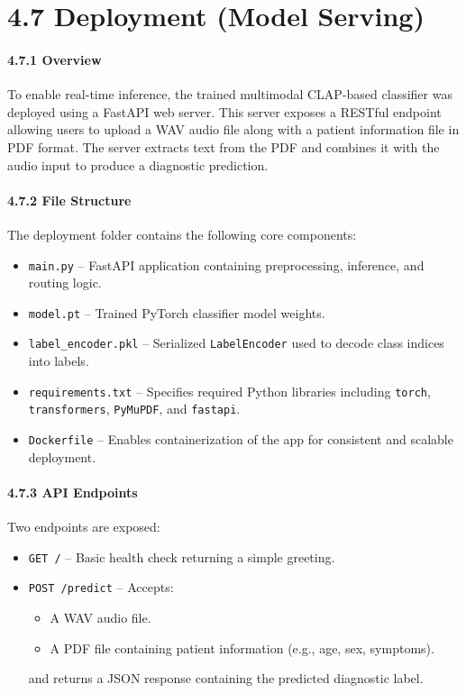 \section*{4.7 Deployment (Model Serving)}

\paragraph{4.7.1 Overview\\}
To enable real-time inference, the trained multimodal CLAP-based classifier was deployed using a FastAPI web server. This server exposes a RESTful endpoint allowing users to upload a WAV audio file along with a patient information file in PDF format. The server extracts text from the PDF and combines it with the audio input to produce a diagnostic prediction.

\paragraph{4.7.2 File Structure\\}
The deployment folder contains the following core components:

\begin{itemize}
    \item \texttt{main.py} – FastAPI application containing preprocessing, inference, and routing logic.
    \item \texttt{model.pt} – Trained PyTorch classifier model weights.
    \item \texttt{label\_encoder.pkl} – Serialized \texttt{LabelEncoder} used to decode class indices into labels.
    \item \texttt{requirements.txt} – Specifies required Python libraries including \texttt{torch}, \texttt{transformers}, \texttt{PyMuPDF}, and \texttt{fastapi}.
    \item \texttt{Dockerfile} – Enables containerization of the app for consistent and scalable deployment.
\end{itemize}

\paragraph{4.7.3 API Endpoints\\}
Two endpoints are exposed:
\begin{itemize}
    \item \texttt{GET /} – Basic health check returning a simple greeting.
    \item \texttt{POST /predict} – Accepts:
    \begin{itemize}
        \item A WAV audio file.
        \item A PDF file containing patient information (e.g., age, sex, symptoms).
    \end{itemize}
    and returns a JSON response containing the predicted diagnostic label.
\end{itemize}

